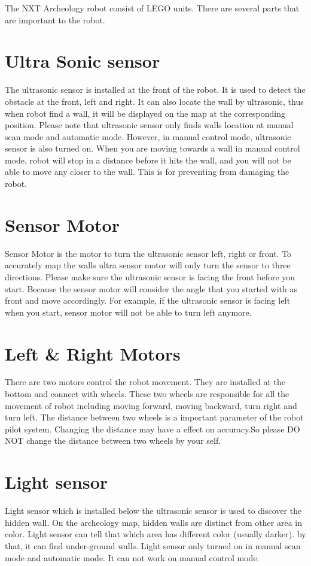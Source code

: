 \documentclass[11pt, a4paper]{report}
\begin{document}
The NXT Archeology robot consist of LEGO units. There are several parts that are important to the robot. 

\section{Ultra Sonic sensor}
The ultrasonic sensor is installed at the front of the robot. It is used to detect the obstacle at the front, left and right. It can also locate the wall by ultrasonic, thus when robot find a wall, it will be displayed on the map at the corresponding position. Please note that ultrasonic sensor only finds walls location at manual scan mode and automatic mode. However, in manual control mode, ultrasonic sensor is also turned on. When you are moving towards a wall in manual control mode, robot will stop in a distance before it hits the wall, and you will not be able to move any closer to the wall. This is for preventing from damaging the robot.


\section{Sensor Motor}
Sensor Motor is the motor to turn the ultrasonic sensor left, right or front. To accurately map the walls ultra sensor motor will only turn the sensor to three directions. Please make sure the ultrasonic sensor is facing the front before you start. Because the sensor motor will consider the angle that you started with as front and move accordingly. For example, if the ultrasonic sensor is facing left when you start, sensor motor will not be able to turn left anymore.


\section{Left \& Right Motors}
There are two motors control the robot movement. They are installed at the bottom and connect with wheels. These two wheels are responsible for all the movement of robot including moving forward, moving backward, turn right and turn left. The distance between two wheels is a important parameter of the robot pilot system. Changing the distance may have a effect on accuracy.So please DO NOT change the distance between two wheels by your self. 


\section{Light sensor}
Light sensor which is installed below the ultrasonic sensor is used to discover the hidden wall. On the archeology map, hidden walls are distinct from other area
 in color. Light sensor can tell that which area has different color (usually darker). by that, it can find under-ground walls. Light sensor only turned on in manual scan mode and automatic mode. It can not work on manual control mode. 
\end{document}
